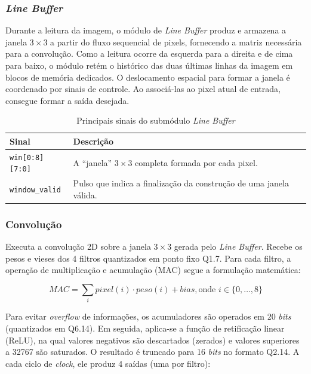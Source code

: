 \subsubsection{\textit{Line Buffer}}
Durante a leitura da imagem, o módulo de \textit{Line Buffer} produz e armazena a janela $3 \times 3$ a partir do fluxo sequencial de pixels, fornecendo a matriz necessária para a convolução. Como a leitura ocorre da esquerda para a direita e de cima para baixo, o módulo retém o histórico das duas últimas linhas da imagem em blocos de memória dedicados. O deslocamento espacial para formar a janela é coordenado por sinais de controle. Ao associá-las ao pixel atual de entrada, consegue formar a saída desejada.

\begin{table}[htbp]
\centering
\caption{Principais sinais do submódulo \textit{Line Buffer}}
\label{tab:sinais_linebuffer}
\small
\begin{tabularx}{\textwidth}{l X}
\toprule
\textbf{Sinal} & \textbf{Descrição} \\
\midrule
\texttt{win[0:8][7:0]} & A ``janela'' $3 \times 3$ completa formada por cada pixel. \\
\texttt{window\_valid} & Pulso que indica a finalização da construção de uma janela válida. \\
\bottomrule
\end{tabularx}
\end{table}

\subsubsection{Convolução}
Executa a convolução 2D sobre a janela $3 \times 3$ gerada pelo \textit{Line Buffer}. Recebe os pesos e vieses dos 4 filtros quantizados em ponto fixo Q1.7. Para cada filtro, a operação de multiplicação e acumulação (MAC) segue a formulação matemática:

$$ MAC = \sum_{i} pixel(i) \cdot peso(i) + bias, \text{onde } i \in \{0, \dots, 8\} $$

Para evitar \textit{overflow} de informações, os acumuladores são operados em 20 \textit{bits} (quantizados em Q6.14). Em seguida, aplica-se a função de retificação linear (ReLU), na qual valores negativos são descartados (zerados) e valores superiores a 32767 são saturados. O resultado é truncado para 16 \textit{bits} no formato Q2.14. A cada ciclo de \textit{clock}, ele produz 4 saídas (uma por filtro):

